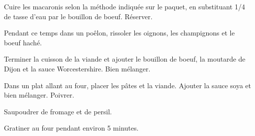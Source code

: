 \begin{steps}
    \item Cuire les macaronis selon la méthode indiquée sur le paquet, en substituant 1/4 de tasse d'eau par le bouillon de boeuf. Réserver.
    \item Pendant ce temps dans un poêlon, rissoler les oignons, les champignons et le boeuf haché.
    \item Terminer la cuisson de la viande et ajouter le bouillon de boeuf, la moutarde de Dijon et la sauce Worcestershire. Bien mélanger.
    \item Dans un plat allant au four, placer les pâtes et la viande. Ajouter la sauce soya et bien mélanger. Poivrer.
    \item Saupoudrer de fromage et de persil.
    \item Gratiner au four pendant environ 5 minutes.
\end{steps}
